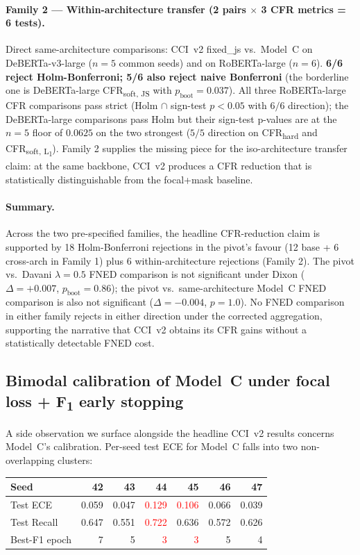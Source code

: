 \paragraph{Family 2 — Within-architecture transfer (2 pairs $\times$ 3 CFR metrics = 6 tests).}
Direct same-architecture comparisons: CCI~v2 fixed\_js vs.\ Model~C on DeBERTa-v3-large ($n=5$ common seeds) and on RoBERTa-large ($n=6$). \textbf{6/6 reject Holm-Bonferroni; 5/6 also reject naive Bonferroni} (the borderline one is DeBERTa-large CFR\textsubscript{soft, JS} with $p_{\text{boot}} = 0.037$). All three RoBERTa-large CFR comparisons pass strict (Holm $\cap$ sign-test $p < 0.05$ with $6/6$ direction); the DeBERTa-large comparisons pass Holm but their sign-test p-values are at the $n=5$ floor of $0.0625$ on the two strongest ($5/5$ direction on CFR\textsubscript{hard} and CFR\textsubscript{soft, L\textsubscript{1}}). Family 2 supplies the missing piece for the iso-architecture transfer claim: at the same backbone, CCI~v2 produces a CFR reduction that is statistically distinguishable from the focal+mask baseline.

\paragraph{Summary.}
Across the two pre-specified families, the headline CFR-reduction claim is supported by 18 Holm-Bonferroni rejections in the pivot's favour (12 base + 6 cross-arch in Family 1) plus 6 within-architecture rejections (Family 2). The pivot vs.\ Davani $\lambda{=}0.5$ FNED comparison is not significant under Dixon ($\Delta = +0.007$, $p_{\text{boot}} = 0.86$); the pivot vs.\ same-architecture Model~C FNED comparison is also not significant ($\Delta = -0.004$, $p = 1.0$). No FNED comparison in either family rejects in either direction under the corrected aggregation, supporting the narrative that CCI~v2 obtains its CFR gains without a statistically detectable FNED cost.

\subsection{Bimodal calibration of Model~C under focal loss + F\textsubscript{1} early stopping}
\label{sec:bimodality}

A side observation we surface alongside the headline CCI~v2 results concerns Model~C's calibration. Per-seed test ECE for Model~C falls into two non-overlapping clusters:

\begin{table}[H]
\centering
\small
\begin{tabular}{lrrrrrr}
\toprule
Seed & 42 & 43 & 44 & 45 & 46 & 47 \\
\midrule
Test ECE      & 0.059 & 0.047 & \textcolor{red}{0.129} & \textcolor{red}{0.106} & 0.066 & 0.039 \\
Test Recall   & 0.647 & 0.551 & \textcolor{red}{0.722} & 0.636 & 0.572 & 0.626 \\
Best-F1 epoch & 7 & 5 & \textcolor{red}{3} & \textcolor{red}{3} & 5 & 4 \\
\bottomrule
\end{tabular}
\end{table}


